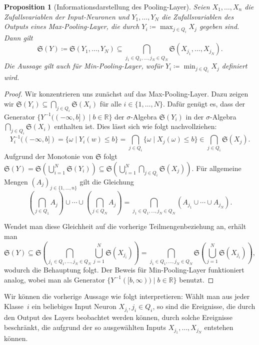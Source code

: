 \documentclass[paper=a4, 	%
		fontsize=11pt,
		abstract=true, 	%
		headsepline, 	%
		notitlepage	%
		]{scrartcl}
\newtheorem{proposition}[theorem]{Proposition}
\theoremstyle{definition}
\newcommand{\R}{\mathbb{R}}
\newcommand{\sig}[1]{\mathfrak{S}{\left( #1 \right)}}
\begin{document}
\begin{proposition}[Informationsdarstellung des Pooling-Layer]
    Seien $X_1,\dots,X_n$ die Zufallsvariablen der Input-Neuronen und $Y_1,\dots,Y_N$ die Zufalls\-variablen des Outputs eines Max-Pooling-Layer, die durch $Y_i\coloneqq \max_{j \in Q_i} X_j$ gegeben sind.
    Dann gilt
    \[
      \sig{Y} \coloneqq \sig{Y_1,\dots,Y_N}\subseteq \bigcap_{j_1\in Q_1,\dots, j_N\in Q_N} \sig{X_{j_1}, \dots, X_{j_N}}  .
    \]
    Die Aussage gilt auch für Min-Pooling-Layer, wofür $Y_i \coloneqq \min_{j\in Q_i} X_j$ definiert wird.
\end{proposition}
\begin{proof}
    Wir konzentrieren uns zunächst auf das Max-Pooling-Layer.
    Dazu zeigen wir $\sig{Y_i} \subseteq \bigcap_{j\in Q_i} \sig{X_i}$ für alle $i\in\{1,\dots,N\}$.
    Dafür genügt es, dass der Generator $\{ Y^{-1}((-\infty, b]) \mid b\in\R \}$ der $\sigma$-Algebra $\sig{Y_i}$ in der $\sigma$-Algebra $\bigcap_{j\in Q_i}\sig{X_i}$ enthalten ist.
    Dies lässt sich wie folgt nachvollziehen:
    \[
        Y_i^{-1}((-\infty, b])
        = \{ \omega \mid Y_i(w) \leq b \}
        = \bigcap_{j\in Q_i} \{\omega\mid X_j(\omega) \leq b\}
        \in \bigcap_{j\in Q_i} \sig{X_j}.
    \]
    Aufgrund der Monotonie von $\mathfrak{S}$ folgt $\sig{Y} = \sig{\bigcup_{i=1}^N \sig{Y_i} }\subseteq \sig{ \bigcup_{i=1}^N \bigcap_{j\in Q_i} \sig{X_j} }$.
    Für allgemeine Mengen $(A_j)_{j\in\{1,\dots,n\}}$ gilt die Gleichung
    \[
        \left(\bigcap_{j\in Q_1} A_j\right) 
        \cup \cdots \cup 
        \left(\bigcap_{j\in Q_N} A_j\right) 
        = \bigcap_{j_1\in Q_1, \dots, j_N\in Q_N} 
        \left( 
            A_{j_1} \cup \cdots \cup A_{j_N}
        \right).
    \]

    Wendet man diese Gleichheit auf die vorherige Teilmengenbeziehung an, erhält man
    \[
        \sig{Y} \subseteq 
        \sig{
        \bigcap_{j_1\in Q_1, \dots, j_N\in Q_N} 
        \bigcup_{j=1}^N \sig{X_{j_i}}
        }
        =
        \bigcap_{j_1\in Q_1, \dots, j_N\in Q_N} 
        \sig{
        \bigcup_{j=1}^N \sig{X_{j_i}}
        },
    \]
    wodurch die Behauptung folgt.
    Der Beweis für Min-Pooling-Layer funktioniert analog, wobei man als Generator $\{ Y^{-1}([b,\infty)) \mid b\in\R\}$ benutzt.
\end{proof}

Wir können die vorherige Aussage wie folgt interpretieren:
Wählt man aus jeder Klasse~$i$ ein beliebiges Input Neuron $X_{j_i}, j_i \in Q_i$, so sind die Ereignisse, die durch den Output des Layers beobachtet werden können, durch solche Ereignisse beschränkt, die aufgrund der so ausgewählten Inputs $X_{j_1},\dots, X_{j_N}$ entstehen können.
\end{document}
